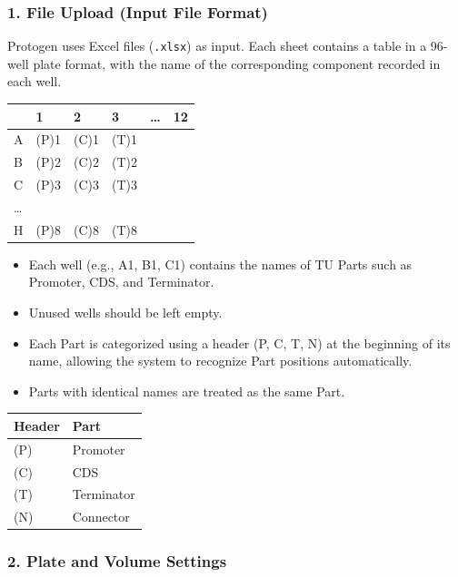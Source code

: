 \documentclass[
  letterpaper,
  DIV=11,
  numbers=noendperiod]{scrartcl}
\providecommand{\tightlist}{%
  \setlength{\itemsep}{0pt}\setlength{\parskip}{0pt}}\usepackage{longtable,booktabs,array}
\begin{document}
\subsubsection{1. File Upload (Input File
Format)}\label{file-upload-input-file-format}

Protogen uses Excel files (\texttt{.xlsx}) as input. Each sheet contains
a table in a 96-well plate format, with the name of the corresponding
component recorded in each well.

\begin{longtable}[]{@{}llllll@{}}
\toprule\noalign{}
& 1 & 2 & 3 & \ldots{} & 12 \\
\midrule\noalign{}
\endhead
\bottomrule\noalign{}
\endlastfoot
A & (P)1 & (C)1 & (T)1 & & \\
B & (P)2 & (C)2 & (T)2 & & \\
C & (P)3 & (C)3 & (T)3 & & \\
\ldots{} & & & & & \\
H & (P)8 & (C)8 & (T)8 & & \\
\end{longtable}

\begin{itemize}
\tightlist
\item
  Each well (e.g., A1, B1, C1) contains the names of TU Parts such as
  Promoter, CDS, and Terminator.\\
\item
  Unused wells should be left empty.\\
\item
  Each Part is categorized using a header (P, C, T, N) at the beginning
  of its name, allowing the system to recognize Part positions
  automatically.\\
\item
  Parts with identical names are treated as the same Part.
\end{itemize}

\begin{longtable}[]{@{}ll@{}}
\toprule\noalign{}
Header & Part \\
\midrule\noalign{}
\endhead
\bottomrule\noalign{}
\endlastfoot
(P) & Promoter \\
(C) & CDS \\
(T) & Terminator \\
(N) & Connector \\
\end{longtable}

\subsubsection{2. Plate and Volume
Settings}\label{plate-and-volume-settings}
\end{document}
